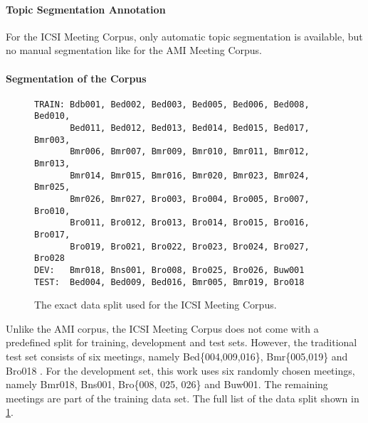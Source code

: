 \paragraph{Topic Segmentation Annotation}

For the ICSI Meeting Corpus, only automatic topic segmentation is available, but no manual segmentation like for the AMI Meeting Corpus.

\paragraph{Segmentation of the Corpus}

\begin{figure}[h]
\begin{lstlisting}[numbers=none]
TRAIN: Bdb001, Bed002, Bed003, Bed005, Bed006, Bed008, Bed010,
       Bed011, Bed012, Bed013, Bed014, Bed015, Bed017, Bmr003,
       Bmr006, Bmr007, Bmr009, Bmr010, Bmr011, Bmr012, Bmr013,
       Bmr014, Bmr015, Bmr016, Bmr020, Bmr023, Bmr024, Bmr025, 
       Bmr026, Bmr027, Bro003, Bro004, Bro005, Bro007, Bro010,
       Bro011, Bro012, Bro013, Bro014, Bro015, Bro016, Bro017,
       Bro019, Bro021, Bro022, Bro023, Bro024, Bro027, Bro028
DEV:   Bmr018, Bns001, Bro008, Bro025, Bro026, Buw001
TEST:  Bed004, Bed009, Bed016, Bmr005, Bmr019, Bro018
\end{lstlisting}
\caption{The exact data split used for the ICSI Meeting Corpus.}
\label{fig:icsi-split}
\end{figure}

Unlike the AMI corpus, the ICSI Meeting Corpus does not come with a predefined split for training, development and test sets.
However, the traditional test set consists of six meetings, namely Bed\{004,009,016\}, Bmr\{005,019\} and Bro018 \cite{inproceedings}.
For the development set, this work uses six randomly chosen meetings, namely Bmr018, Bns001, Bro\{008, 025, 026\} and Buw001.
The remaining meetings are part of the training data set.
The full list of the data split shown in \cref{fig:icsi-split}.